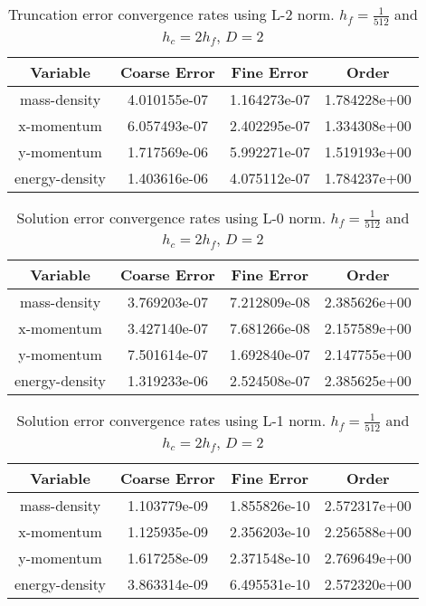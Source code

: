 \begin{table}[p]
\begin{center}
\begin{tabular}{|c|c|c|c|} \hline
Variable & Coarse Error & Fine Error & Order\\
\hline \hline 
mass-density &    	 4.010155e-07 & 1.164273e-07 & 1.784228e+00 \\ 
\hline
x-momentum &    	 6.057493e-07 & 2.402295e-07 & 1.334308e+00 \\ 
\hline
y-momentum &    	 1.717569e-06 & 5.992271e-07 & 1.519193e+00 \\ 
\hline
energy-density &    	 1.403616e-06 & 4.075112e-07 & 1.784237e+00 \\ 
\hline
\end{tabular}
\end{center}
\caption{Truncation error convergence rates using L-2 norm. 
$h_f = \frac{1}{512}$ and $h_c = 2 h_f$, $D = 2$ }
\end{table}


\begin{table}[p]
\begin{center}
\begin{tabular}{|c|c|c|c|} \hline
Variable & Coarse Error & Fine Error & Order\\
\hline \hline 
mass-density &    	 3.769203e-07 & 7.212809e-08 & 2.385626e+00 \\ 
\hline
x-momentum &    	 3.427140e-07 & 7.681266e-08 & 2.157589e+00 \\ 
\hline
y-momentum &    	 7.501614e-07 & 1.692840e-07 & 2.147755e+00 \\ 
\hline
energy-density &    	 1.319233e-06 & 2.524508e-07 & 2.385625e+00 \\ 
\hline
\end{tabular}
\end{center}
\caption{Solution error convergence rates using L-0 norm. 
$h_f = \frac{1}{512}$ and $h_c = 2 h_f$, $D = 2$ }
\end{table}


\begin{table}[p]
\begin{center}
\begin{tabular}{|c|c|c|c|} \hline
Variable & Coarse Error & Fine Error & Order\\
\hline \hline 
mass-density &    	 1.103779e-09 & 1.855826e-10 & 2.572317e+00 \\ 
\hline
x-momentum &    	 1.125935e-09 & 2.356203e-10 & 2.256588e+00 \\ 
\hline
y-momentum &    	 1.617258e-09 & 2.371548e-10 & 2.769649e+00 \\ 
\hline
energy-density &    	 3.863314e-09 & 6.495531e-10 & 2.572320e+00 \\ 
\hline
\end{tabular}
\end{center}
\caption{Solution error convergence rates using L-1 norm. 
$h_f = \frac{1}{512}$ and $h_c = 2 h_f$, $D = 2$ }
\end{table}


